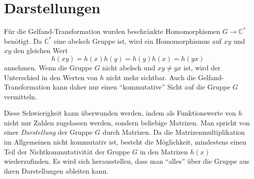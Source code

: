 %
%
%
\section{Darstellungen
\label{buch:gruppen:section:darstellung}}
Für die Gelfand-Transformation wurden beschränkte Homomorphismen
$G\to\mathbb{C}^*$ benötigt.
Da $\mathbb{C}^*$ eine abelsch Gruppe ist, wird ein Homomorphismus
auf $xy$ und $xy$ den gleichen Wert
\[
h(xy) = h(x)h(y) = h(y)h(x) = h(yx)
\]
annehmen.
Wenn die Gruppe $G$ nicht abelsch und $xy\ne yx$ ist, wird der
Unterschied in den Werten von $h$ nicht mehr sichtbar.
Auch die Gelfand-Transformation kann daher nur einen ``kommutative''
Sicht auf die Gruppe $G$ vermitteln.

Diese Schwierigkeit kann überwunden werden, indem als Funktionswerte
von $h$ nicht nur Zahlen zugelassen werden, sondern beliebige
Matrizen.
Man spricht von einer {\em Darstellung} der Gruppe $G$ durch
Matrizen.
Da die Matrizenmultiplikation im Allgemeinen nicht kommutativ
ist, besteht die Möglichkeit, mindestens einen Teil der
Nichtkommutativität der Gruppe $G$ in den Matrizen $h(x)$
wiederzufinden.
Es wird sich herausstellen, dass man ``alles'' über die Gruppe aus
ihren Darstellungen ableiten kann.













